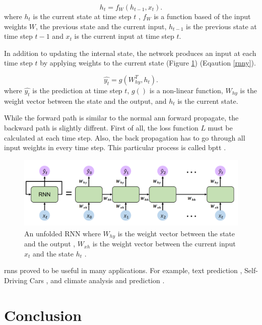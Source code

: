 \documentclass[runningheads]{llncs}
\begin{document}
\begin{equation}
    \label{rnn}
    h_{t} = f_{W}(h_{t-1}, x_{t}).
\end{equation}
where $h_{t}$ is the current state at time step $t$ , $f_{W}$ is a function
based of the input weights $W$, the previous state and the current input,  
$h_{t-1}$ is the previous state at time step $t-1$ and $x_{t}$ is the current input at time step $t$. 

In addition to updating the internal state, the network produces an input at each
time step $t$ by applying weights to the current state (Figure \ref{rnnf}) (Eqaution \ref{rnny}).

\begin{equation}
    \label{rnny}
    \hat{y_{t}} = g(W^T_{hy}, h_{t}).
\end{equation}
where $\hat{y_{t}}$ is the prediction at time step $t$, $g()$ is a non-linear function,
$W_{hy}$ is the weight vector between the state and the output, and $h_{t}$ is the current state.


While the forward path is similar to the normal \gls{ann} forward propagate, 
the backward path is slightly diffrent. First of all, the loss function $L$ must be calculated
at each time step. Also, the back propagation has to go through all input weights in 
every time step. This particular process is called \gls{bptt} \cite{werbos1990backpropagation}.

\begin{figure}[H]
    \label{rnnf}
    \centering
    \includegraphics[height=3.5cm]{rnn}
    \caption{An unfolded RNN where $W_{hy}$ is the weight vector between the state and the output 
    , $W_{xh}$ is the weight vector between the current input $x_{t}$ and the state $h_{t}$ \cite{mitlectwo}.}
\end{figure}

\gls{rnns} proved to be useful in many applications. For example, 
text prediction \cite{jagannatha2016structured}, Self-Driving Cars \cite{gu2020lstm}, and climate analysis and prediction \cite{earthnet}.


\section{Conclusion}
\end{document}
